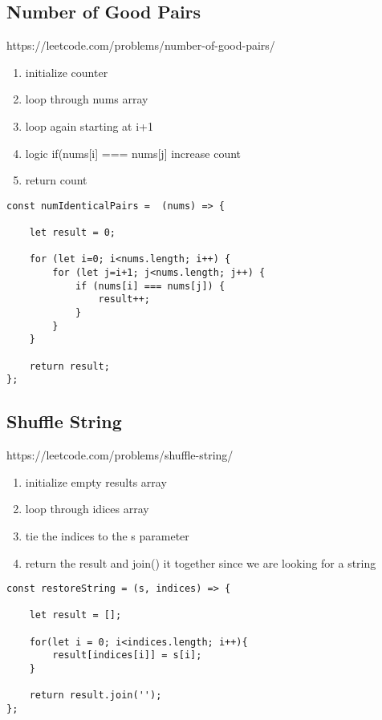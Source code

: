 \documentclass[10pt]{article}
\begin{document}
\pagebreak
\medskip %
\subsection{Number of Good Pairs}
https://leetcode.com/problems/number-of-good-pairs/

\begin{enumerate}
	\item initialize counter
	\item loop through nums array
	\item loop again starting at i+1 
	\item logic if(nums[i] === nums[j] increase count
	\item return count
\end{enumerate}

\begin{lstlisting}[title=Solution numIdenticalPairs, captionpos=t]
const numIdenticalPairs =  (nums) => {

    let result = 0;

    for (let i=0; i<nums.length; i++) {
        for (let j=i+1; j<nums.length; j++) {
            if (nums[i] === nums[j]) {
                result++;
            }
        }
    }
    
    return result; 
};
\end{lstlisting}

\medskip %

\pagebreak
\medskip %
\subsection{Shuffle String}
https://leetcode.com/problems/shuffle-string/

\begin{enumerate}
	\item initialize empty results array
	\item loop through idices array
	\item tie the indices to the s parameter
	\item return the result and join() it together since we are looking for a string 
\end{enumerate}

\begin{lstlisting}[title=Solution restoreString, captionpos=t]
const restoreString = (s, indices) => {
    
    let result = [];

    for(let i = 0; i<indices.length; i++){
        result[indices[i]] = s[i];
    }

    return result.join('');
};
\end{lstlisting}
\end{document}
